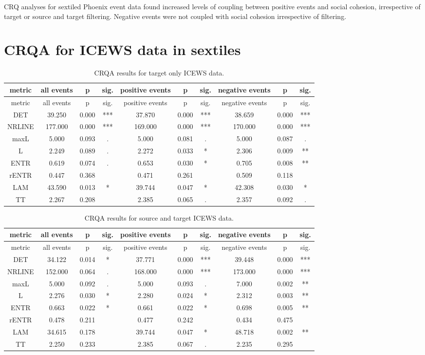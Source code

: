 \begin{appendix}
CRQ analyses for sextiled Phoenix event data found increased levels of
coupling between positive events and social cohesion, irrespective of
target or source and target filtering. Negative events were not coupled
with social cohesion irrespective of filtering.

\hypertarget{crqa-for-icews-data-in-sextiles}{%
\section{CRQA for ICEWS data in
sextiles}\label{crqa-for-icews-data-in-sextiles}}

\begin{longtable}[]{@{}cccccccccc@{}}
\caption{CRQA results for target only ICEWS data.}\tabularnewline
\toprule
metric & all events & p & sig. & positive events & p & sig. & negative
events & p & sig.\tabularnewline
\midrule
\endfirsthead
\toprule
metric & all events & p & sig. & positive events & p & sig. & negative
events & p & sig.\tabularnewline
\midrule
\endhead
DET & 39.250 & 0.000 & *** & 37.870 & 0.000 & *** & 38.659 & 0.000 &
***\tabularnewline
NRLINE & 177.000 & 0.000 & *** & 169.000 & 0.000 & *** & 170.000 & 0.000
& ***\tabularnewline
maxL & 5.000 & 0.093 & . & 5.000 & 0.081 & . & 5.000 & 0.087 &
.\tabularnewline
L & 2.249 & 0.089 & . & 2.272 & 0.033 & * & 2.306 & 0.009 &
**\tabularnewline
ENTR & 0.619 & 0.074 & . & 0.653 & 0.030 & * & 0.705 & 0.008 &
**\tabularnewline
rENTR & 0.447 & 0.368 & & 0.471 & 0.261 & & 0.509 & 0.118
&\tabularnewline
LAM & 43.590 & 0.013 & * & 39.744 & 0.047 & * & 42.308 & 0.030 &
*\tabularnewline
TT & 2.267 & 0.208 & & 2.385 & 0.065 & . & 2.357 & 0.092 &
.\tabularnewline
\bottomrule
\end{longtable}

\begin{longtable}[]{@{}cccccccccc@{}}
\caption{CRQA results for source and target ICEWS data.}\tabularnewline
\toprule
metric & all events & p & sig. & positive events & p & sig. & negative
events & p & sig.\tabularnewline
\midrule
\endfirsthead
\toprule
metric & all events & p & sig. & positive events & p & sig. & negative
events & p & sig.\tabularnewline
\midrule
\endhead
DET & 34.122 & 0.014 & * & 37.771 & 0.000 & *** & 39.448 & 0.000 &
***\tabularnewline
NRLINE & 152.000 & 0.064 & . & 168.000 & 0.000 & *** & 173.000 & 0.000 &
***\tabularnewline
maxL & 5.000 & 0.092 & . & 5.000 & 0.093 & . & 7.000 & 0.002 &
**\tabularnewline
L & 2.276 & 0.030 & * & 2.280 & 0.024 & * & 2.312 & 0.003 &
**\tabularnewline
ENTR & 0.663 & 0.022 & * & 0.661 & 0.022 & * & 0.698 & 0.005 &
**\tabularnewline
rENTR & 0.478 & 0.211 & & 0.477 & 0.242 & & 0.434 & 0.475
&\tabularnewline
LAM & 34.615 & 0.178 & & 39.744 & 0.047 & * & 48.718 & 0.002 &
**\tabularnewline
TT & 2.250 & 0.233 & & 2.385 & 0.067 & . & 2.235 & 0.295
&\tabularnewline
\bottomrule
\end{longtable}


\end{appendix}
